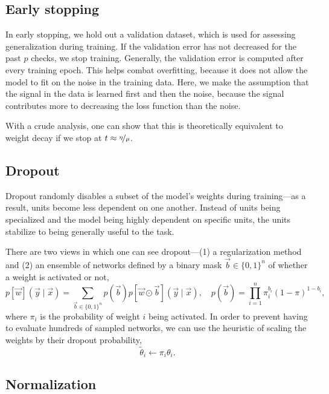 \subsection{Early stopping}

In early stopping, we hold out a validation dataset, which is used for assessing generalization
during training. If the validation error has not decreased for the past $p$ checks, we stop
training. Generally, the validation error is computed after every training epoch. This helps combat
overfitting, because it does not allow the model to fit on the noise in the training data. Here, we
make the assumption that the signal in the data is learned first and then the noise, because the
signal contributes more to decreasing the loss function than the noise.

With a crude analysis, one can show that this is theoretically equivalent to weight decay if we
stop at $t \approx \nicefrac{\eta}{\mu}$.

\subsection{Dropout}

Dropout \citep{srivastava2014dropout} randomly disables a subset of the model's weights during
training---as a result, units become less dependent on one another. Instead of units being
specialized and the model being highly dependent on specific units, the units stabilize to being
generally useful to the task.

There are two views in which one can see dropout---(1) a regularization method and (2) an ensemble
of networks defined by a binary mask $\vec{b} \in \{ 0,1 \}^n$ of whether a weight is activated or
not, \[
    p[\vec{w}](\vec{y} \mid \vec{x}) = \sum_{\vec{b} \in \{ 0,1 \}^n} p(\vec{b}) p[\vec{w} \odot \vec{b}](\vec{y} \mid \vec{x}), \quad p(\vec{b}) = \prod_{i=1}^n \pi^{b_i}_i (1-\pi)^{1-b_i},
\]
where $\pi_i$ is the probability of weight $i$ being activated. In order to prevent having to
evaluate hundreds of sampled networks, we can use the heuristic of scaling the weights by their
dropout probability, \[
    \tilde{\theta}_i \gets \pi_i \theta_i.
\]

\subsection{Normalization}

